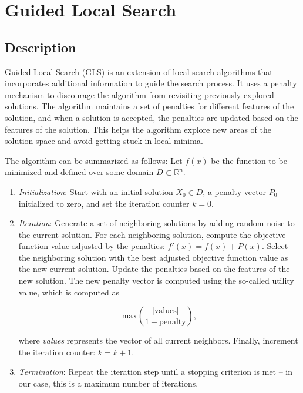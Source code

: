 \documentclass{article}
\begin{document}
\section{Guided Local Search}

\subsection{Description}

Guided Local Search (GLS) is an extension of local search algorithms
that incorporates additional information to guide the search process.
It uses a penalty mechanism to discourage the algorithm from revisiting
previously explored solutions. The algorithm maintains a set of
penalties for different features of the solution, and when a solution is
accepted, the penalties are updated based on the features of the
solution. This helps the algorithm explore new areas of the solution
space and avoid getting stuck in local minima.

The algorithm can be summarized as follows:
Let $f(x)$ be the function to be minimized and defined over some domain
$D \subset \mathbb{R}^n$.

\begin{enumerate}
  \item \textit{Initialization}: Start with an initial solution $X_0
    \in D$, a penalty vector $P_0$ initialized to zero, and set the
    iteration counter $k = 0$.
  \item \textit{Iteration}: Generate a set of neighboring solutions
    by adding random noise to the current solution. For each
    neighboring solution, compute the objective function value
    adjusted by the penalties: $f'(x) = f(x) + P(x)$. Select the
    neighboring solution with the best adjusted objective function
    value as the new current solution. Update the penalties based on
    the features of the new solution. The new penalty vector is
    computed using the so-called utility value, which is computed as

    \[\text{max}\left( \frac{|\text{values}|}{1 + \text{penalty}} \right),\]

    where \textit{values} represents the vector of all
    current neighbors. Finally, increment the iteration counter: $k = k + 1$.
  \item \textit{Termination}: Repeat the iteration step until a
    stopping criterion is met -- in our case, this is a maximum
    number of iterations.
\end{enumerate}
\end{document}
